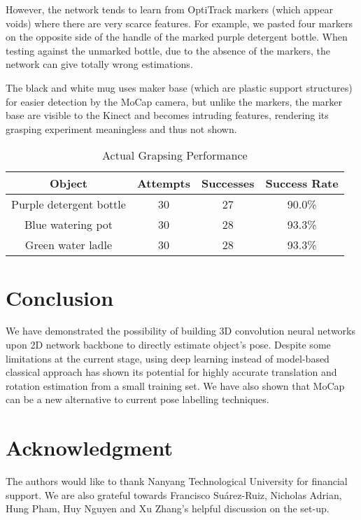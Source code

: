 \documentclass[conference]{IEEEtran}
\begin{document}
However, the network tends to learn from OptiTrack markers (which appear voids) where there are very scarce features. For example, we pasted four markers on the opposite side of the handle of the marked purple detergent bottle. When testing against the unmarked bottle, due to the absence of the markers, the network can give totally wrong estimations. 

The black and white mug uses maker base (which are plastic support structures) for easier detection by the MoCap camera, but unlike the markers, the marker base are visible to the Kinect and becomes intruding features, rendering its grasping experiment meaningless and thus not shown. 

\begin{table}[htbp]
\caption{Actual Grapsing Performance}
\begin{center}
\begin{tabular}{|c|c|c|c|}
\hline
\textbf{Object}&\textbf{Attempts}&\textbf{Successes}&\textbf{Success Rate} \\
\hline 
Purple detergent bottle&30&27&90.0\% \\
\hline
Blue watering pot&30&28&93.3\% \\ 
\hline
Green water ladle&30&28&93.3\% \\
\hline
\end{tabular}
\label{tab_actual_grasping_perf}
\end{center}
\end{table}


\section{Conclusion}
We have demonstrated the possibility of building 3D convolution neural networks upon 2D network backbone to directly estimate object's pose. Despite some limitations at the current stage, using deep learning instead of model-based classical approach has shown its potential for highly accurate translation and rotation estimation from a small training set. We have also shown that MoCap can be a new alternative to current pose labelling techniques.


\section{Acknowledgment}
The authors would like to thank Nanyang Technological University for financial support. We are also grateful towards Francisco Suárez-Ruiz, Nicholas Adrian, Hung Pham, Huy Nguyen and Xu Zhang's helpful discussion on the set-up.




\end{document}
